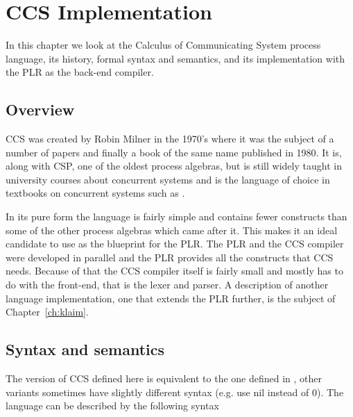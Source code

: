\chapter{CCS Implementation}\label{ch:ccs_implementation}

	In this chapter we look at the Calculus of Communicating System process 
	language, its history, formal syntax and semantics, and its implementation 
	with the PLR as the back-end compiler. 
	
\section{Overview}

	CCS was created by Robin Milner in the 1970's where it was the subject of a 
	number of papers \cite{milner1,milner2,milner3} and finally a book 
	of the same name \cite{Milner80} published in 1980. It is, along with CSP, 
	one of the oldest process algebras, but is still widely taught in university 
	courses about concurrent systems and is the language of choice in textbooks 
	on concurrent systems such as \cite{reactive}. 
	
	In its pure form the language is fairly simple and contains fewer constructs 
	than some of the other process algebras which came after it. This makes it 
	an ideal candidate to use as the blueprint for the PLR. The PLR and the CCS 
	compiler were developed in parallel and the PLR provides all the constructs 
	that CCS needs. Because of that the CCS compiler itself is fairly 
	small and mostly has to do with the front-end, that is the lexer and parser. 
	A description of another language implementation, one that extends the PLR 
	further, is the subject of Chapter~\ref{ch:klaim}.
	
\section{Syntax and semantics}\label{sec:ccs_syntax}

	The version of CCS defined here is equivalent to the one defined in 
	\cite{reactive}, other variants sometimes have slightly different syntax 
	(e.g. use \textsf{nil} instead of 0). The language can be described by the 
	following syntax

